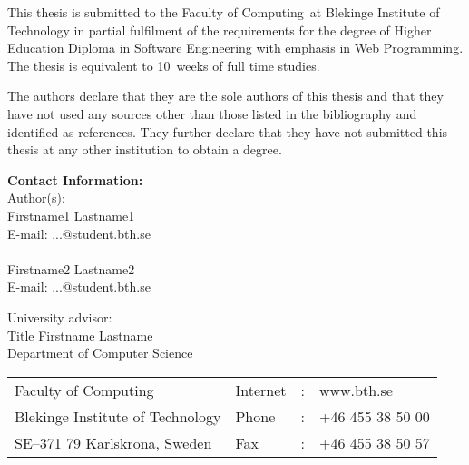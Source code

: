 \documentclass[a4paper,twoside]{bth}
\makeatletter
\newcommand{\thesisDegree}{Higher Education Diploma in Software Engineering with emphasis in Web Programming}
\newcommand{\faculty}{Computing}
\newcommand{\thesisWeeks}{10}
\newcommand{\authorFirst}{Firstname1 Lastname1}
\newcommand{\authorFirstMail}{...@student.bth.se}
\newcommand{\authorSecond}{Firstname2 Lastname2}
\newcommand{\authorSecondMail}{...@student.bth.se}
\newcommand{\super}{Title Firstname Lastname}
\newcommand{\superAffiliation}{Computer Science}
\makeatother
\begin{document}
{\pagestyle{empty}
\changepage{3cm}{1cm}{-0.5cm}{-0.5cm}{}{-1.5cm}{}{}{}

{\small
\noindent
This thesis is submitted to the Faculty of \faculty\ at Blekinge Institute
of Technology in partial fulfilment of the requirements for the degree of
\thesisDegree. The thesis is equivalent to \thesisWeeks\ weeks of full time studies.

\vspace{1cm}

\noindent
The authors declare that they are the sole authors of this thesis and that they have
not used any sources other than those listed in the bibliography and identified as references.
They further declare that they have not submitted this thesis at any other institution to
obtain a degree.
}

\vspace{10cm}

\noindent
\textbf{Contact Information:} \\
Author(s): \\
\authorFirst \\
E-mail: \authorFirstMail \\
\\
\authorSecond \\
E-mail: \authorSecondMail

\vspace{2cm}

\noindent
University advisor: \\
\super \\
Department of \superAffiliation

\vspace*{\fill}

\noindent
\begin{tabular}{@{}p{} l c l}
Faculty of \faculty              & Internet & : & www.bth.se \\
Blekinge Institute of Technology & Phone    & : & +46 455 38 50 00 \\
SE--371 79 Karlskrona, Sweden    & Fax      & : & +46 455 38 50 57 \\
\end{tabular}
\clearpage
} %

\setcounter{page}{1}

\end{document}

